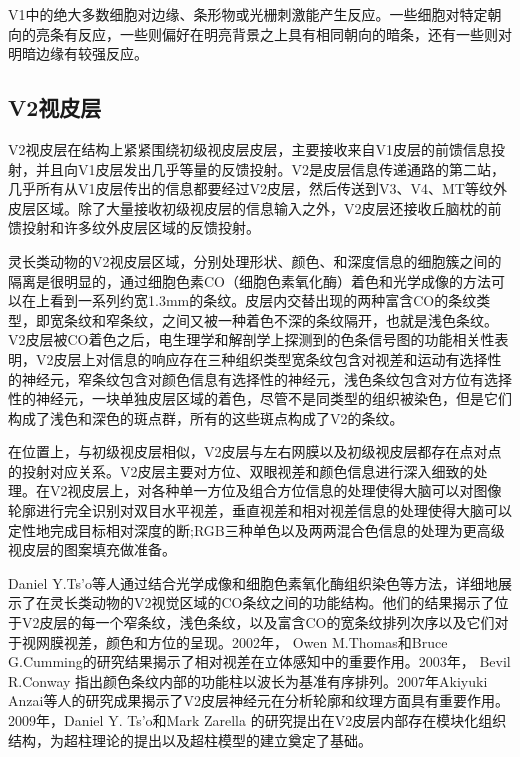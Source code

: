 \documentclass[a4paper,10pt]{article}\large
\begin{document}
V1中的绝大多数细胞对边缘、条形物或光栅刺激能产生反应\cite{15:book}。一些细胞对特定朝向的亮条有反应，一些则偏好在明亮背景之上具有相同朝向的暗条，还有一些则对明暗边缘有较强反应。


\subsection{V2视皮层}



V2视皮层\cite{9:article}在结构上紧紧围绕初级视皮层皮层，主要接收来自V1皮层的前馈信息投射，并且向V1皮层发出几乎等量的反馈投射。V2是皮层信息传递通路的第二站，几乎所有从V1皮层传出的信息都要经过V2皮层，然后传送到V3、V4、MT等纹外皮层区域。除了大量接收初级视皮层的信息输入之外，V2皮层还接收丘脑枕的前馈投射和许多纹外皮层区域的反馈投射。


灵长类动物的V2视皮层区域\cite{16:book}，分别处理形状、颜色、和深度信息的细胞簇之间的隔离是很明显的，通过细胞色素CO（细胞色素氧化酶）着色和光学成像的方法可以在上看到一系列约宽1.3mm的条纹。皮层内交替出现的两种富含CO的条纹类型，即宽条纹和窄条纹，之间又被一种着色不深的条纹隔开，也就是浅色条纹。V2皮层被CO着色之后，电生理学和解剖学上探测到的色条信号图的功能相关性表明，V2皮层上对信息的响应存在三种组织类型宽条纹包含对视差和运动有选择性的神经元，窄条纹包含对颜色信息有选择性的神经元，浅色条纹包含对方位有选择性的神经元，一块单独皮层区域的着色，尽管不是同类型的组织被染色，但是它们构成了浅色和深色的斑点群，所有的这些斑点构成了V2的条纹。


在位置上，与初级视皮层相似，V2皮层与左右网膜以及初级视皮层都存在点对点的投射对应关系\cite{5:article}。V2皮层主要对方位、双眼视差和颜色信息进行深入细致的处理。在V2视皮层上，对各种单一方位及组合方位信息的处理使得大脑可以对图像轮廓进行完全识别对双目水平视差，垂直视差和相对视差信息的处理使得大脑可以定性地完成目标相对深度的断;RGB三种单色以及两两混合色信息的处理为更高级视皮层的图案填充做准备。


Daniel Y.Ts’o等人通过结合光学成像和细胞色素氧化酶组织染色等方法，详细地展示了在灵长类动物的V2视觉区域的CO条纹之间的功能结构。他们的结果揭示了位于V2皮层的每一个窄条纹，浅色条纹，以及富含CO的宽条纹排列次序以及它们对于视网膜视差，颜色和方位的呈现。2002年， Owen M.Thomas和Bruce G.Cumming的研究结果\cite{16:book}揭示了相对视差在立体感知中的重要作用。2003年， Bevil R.Conway 指出颜色条纹内部的功能柱以波长为基准有序排列。2007年Akiyuki Anzai等人的研究成果揭示了V2皮层神经元在分析轮廓和纹理方面具有重要作用。2009年，Daniel Y. Ts’o和Mark Zarella 的研究提出在V2皮层内部存在模块化组织结构，为超柱理论的提出以及超柱模型的建立奠定了基础。
\end{document}
